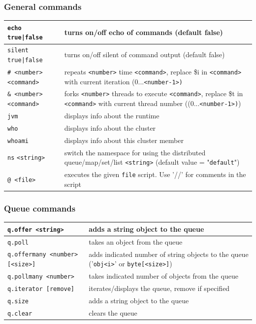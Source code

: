 \subsubsection*{General commands}
\begin{tabular}{|p{}|p{}|}
    \hline
    \texttt{echo true|false} & turns on/off echo of commands (default false)\\\hline
    \texttt{silent true|false} & turns on/off silent of command output (default false)\\\hline
    \texttt{\# <number> <command>}& repeats \texttt{<number>} time \texttt{<command>}, replace \$i in \texttt{<command>} with current iteration (0...\texttt{<number-1>)}\\\hline
    \texttt{\& <number> <command>}& forks \texttt{<number>} threads to execute \texttt{<command>}, replace \$t in \texttt{<command>} with current thread number ((0...\texttt{<number-1>)})\\\hline
    \texttt{jvm} & displays info about the runtime\\\hline
    \texttt{who} & displays info about the cluster\\\hline
    \texttt{whoami} & displays info about this cluster member\\\hline
    \texttt{ns} \texttt{<string>} & switch the namespace for using the distributed queue/map/set/list \texttt{<string>} \newline (default value = "\texttt{default}")\\\hline
    \texttt{@ <file>} & executes the given \texttt{file} script. Use '//' for comments in the script\\\hline
\end{tabular}
\subsubsection*{Queue commands}
\begin{tabular}{|p{}|p{}|}
    \hline
    \texttt{q.offer <string>} & adds a string object to the queue\\\hline
    \texttt{q.poll} & takes an object from the queue\\\hline
    \texttt{q.offermany <number> [<size>]} & adds indicated number of string objects to the queue ('\texttt{obj<i>}' or \texttt{byte[<size>]})\\\hline
    \texttt{q.pollmany <number>} & takes indicated number of objects from the queue\\\hline
    \texttt{q.iterator [remove]} & iterates/displays the queue, remove if specified\\\hline
    \texttt{q.size} & adds a string object to the queue\\\hline
    \texttt{q.clear} & clears the queue\\\hline
\end{tabular}
